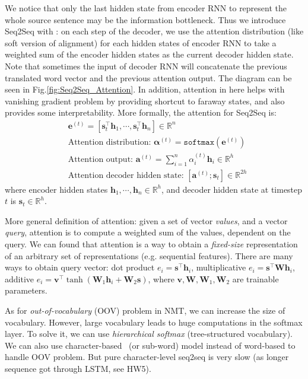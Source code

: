 We notice that only the last hidden state from encoder RNN to represent the whole source sentence may be the information bottleneck.
Thus we introduce Seq2Seq with : on each step of the decoder, we use the attention distribution (like soft version of alignment) for each hidden states of encoder RNN to take a weighted sum of the encoder hidden states as the current decoder hidden state.
Note that sometimes the input of decoder RNN will concatenate the previous translated word vector and the previous attention output.
The diagram can be seen in Fig.\ref{fig:Seq2Seq_Attention}.
In addition, attention in here helps with vanishing gradient problem by providing shortcut to faraway states, and also provides some interpretability.
More formally, the attention for Seq2Seq is:
\begin{align}
&\bm{e}^{(t)} = [\bm{s}_t^\top \bm{h}_1, \cdots, \bm{s}_t^\top \bm{h}_n] \in \mathbb{R}^n \nonumber \\
&\text{Attention distribution: } \bm{\alpha}^{(t)} = \texttt{softmax}(\bm{e}^{(t)}) \nonumber \\
&\text{Attention output: } \bm{a}^{(t)} = \sum_{i=1}^n \alpha_i^{(t)} \bm{h}_i \in \mathbb{R}^h \nonumber \\
&\text{Attention decoder hidden state: } [\bm{a}^{(t)}; \bm{s}_t] \in \mathbb{R}^{2h}
\end{align}
where encoder hidden states $\bm{h}_1, \cdots, \bm{h}_n \in \mathbb{R}^h$, and decoder hidden state at timestep $t$ is $\bm{s}_t \in \mathbb{R}^h$.

More general definition of attention: given a set of vector \emph{values}, and a vector \emph{query}, attention is to compute a weighted sum of the values, dependent on the query.
We can found that attention is a way to obtain a \emph{fixed-size} representation of an arbitrary set of representations (e.g. sequential features).
There are many ways to obtain query vector: dot product $e_i = \bm{s}^\top \bm{h}_i$, multiplicative $e_i = \bm{s}^\top \bm{W} \bm{h}_i$, additive $e_i = \bm{v}^\top \tanh (\bm{W}_1 \bm{h}_i + \bm{W}_2 \bm{s})$, where $\bm{v}, \bm{W}, \bm{W}_1, \bm{W}_2$ are trainable parameters.

As for \emph{out-of-vocabulary} (OOV) problem in NMT, we can increase the size of vocabulary.
However, large vocabulary leads to huge computations in the softmax layer.
To solve it, we can use \emph{hierarchical softmax} (tree-structured vocabulary).
We can also use character-based~\cite{CharCNN} (or sub-word) model instead of word-based to handle OOV problem. But pure character-level seq2seq is very slow (as longer sequence got through LSTM, see HW5).

